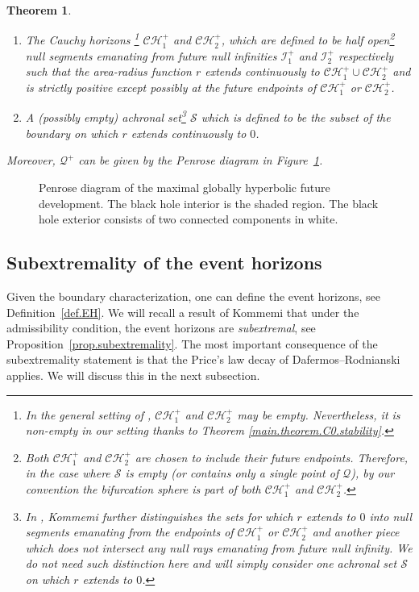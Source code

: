 \documentclass[10pt, reqno]{amsart}
\newtheorem{theorem}{Theorem}[section]
\theoremstyle{definition}
\theoremstyle{remark}
\numberwithin{equation}{section}
\newcommand{\0}{\emptyset}
\newcommand{\calC}{\mathcal C}
\newcommand{\calH}{\mathcal H}
\newcommand{\CH}{\calC \calH^{+}}		%
\begin{document}
\begin{theorem}
\begin{enumerate}
\begin{enumerate}
\item The Cauchy horizons \footnote{In the general setting of \cite{Kommemi}, $\CH_1$ and $\CH_2$ may be empty. Nevertheless, it is non-empty in our setting thanks to Theorem \ref{main.theorem.C0.stability}.} $\CH_1$ and $\CH_2$, which are defined to be half open\footnote{Both $\CH_1$ and $\CH_2$ are chosen to include their future endpoints. Therefore, in the case where $\mathcal S$ is empty (or contains only a single point of $\mathcal Q$), by our convention the bifurcation sphere is part of both $\CH_1$ and $\CH_2$.} null segments emanating from future null infinities $\mathcal I^+_1$ and $\mathcal I^+_2$ respectively such that the area-radius function $r$ extends continuously to $\CH_1\cup \CH_2$ and is strictly positive except possibly at the future endpoints of $\CH_1$ or $\CH_2$.
\item A (possibly empty) achronal set\footnote{In \cite{Kommemi}, Kommemi further distinguishes the sets for which $r$ extends to $0$ into null segments emanating from the endpoints of $\CH_1$ or $\CH_2$ and another piece which does not intersect any null rays emanating from future null infinity. We do not need such distinction here and will simply consider one achronal set $\mathcal S$ on which $r$ extends to $0$.} $\mathcal S$ which is defined to be the subset of the boundary on which $r$ extends continuously to $0$.
\end{enumerate}
Moreover, $\mathcal Q^+$ can be given by the Penrose diagram in Figure~\ref{fig:Kommemi}.
\end{enumerate}
\end{theorem}

\begin{figure}[h] 
\begin{center}
\def\svgwidth{250px}
 
\caption{Penrose diagram of the maximal globally hyperbolic future development. The black hole interior is the shaded region. The black hole exterior consists of two connected components in white.}  \label{fig:Kommemi}
\end{center}
\end{figure}

\subsection{Subextremality of the event horizons}
Given the boundary characterization, one can define the event horizons, see Definition~\ref{def.EH}. We will recall a result of Kommemi that under the admissibility condition, the event horizons are \emph{subextremal}, see Proposition~\ref{prop.subextremality}. The most important consequence of the subextremality statement is that the Price's law decay of Dafermos--Rodnianski applies. We will discuss this in the next subsection.
\end{document}
